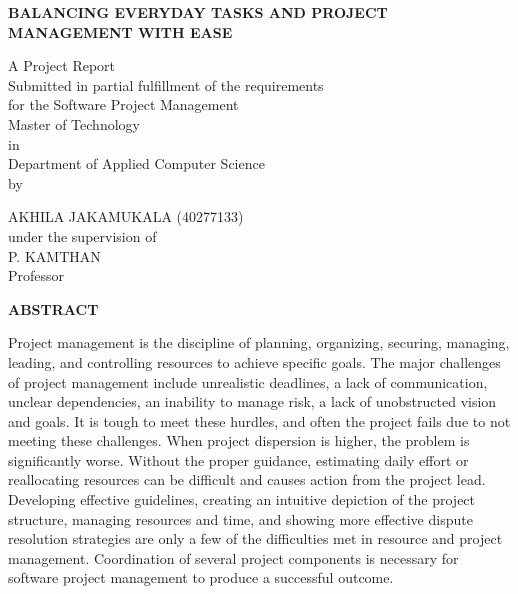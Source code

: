 \documentclass{chart}
\date{2023}
\begin{document}
 
\begin{titlepage}
 \begin{center}
 \vspace*{1cm}

       \textbf{BALANCING EVERYDAY TASKS AND PROJECT MANAGEMENT WITH EASE}

       \vspace{0.5cm}
        A Project Report\\
Submitted in partial fulfillment of the requirements\\ for
the Software Project Management\\

 \vspace{1cm}
        Master of Technology\\
in\\
Department of Applied Computer Science\\
\vspace*{1cm}
        by\\
       \vspace*{1cm}

        AKHILA JAKAMUKALA (40277133)\\
     under the supervision of\\
	 P. KAMTHAN\\
	Professor

            
       \vspace{1.5cm}
              
   \end{center}
\end{titlepage}

 \begin{center}
\textbf{ABSTRACT}
\end{center}
 \hspace{1cm}Project management is the discipline of planning, organizing, securing, managing, leading, and controlling resources to achieve specific goals. The major challenges of project management include unrealistic deadlines, a lack of communication, unclear dependencies, an inability to manage risk, a lack of unobstructed vision and goals. It is tough to meet these hurdles, and often the project fails due to not meeting these challenges. When project dispersion is higher, the problem is significantly worse. Without the proper guidance, estimating daily effort or reallocating resources can be difficult and causes action from the project lead. Developing effective guidelines, creating an intuitive depiction of the project structure, managing resources and time, and showing more effective dispute resolution strategies are only a few of the difficulties met in resource and project management. Coordination of several project components is necessary for software project management to produce a successful outcome. \\
 	            
\end{document}
